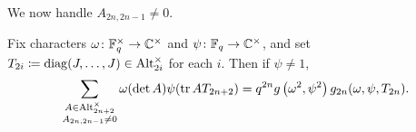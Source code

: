 We now handle $A_{2n,2n-1}\ne0$.
\begin{lemma} \label{lem:gsum-alt-not-0}
    Fix characters $\omega\colon\mathbb F_q^\times\to\mathbb C^\times$ and $\psi\colon\mathbb F_q\to\mathbb C^\times$, and set $T_{2i}\coloneqq\operatorname{diag}(J,\ldots,J)\in\operatorname{Alt}^\times_{2i}$ for each $i$. Then if $\psi\ne1$,
    \[\sum_{\substack{A\in\operatorname{Alt}_{2n+2}^\times\\A_{2n,2n-1}\ne0}}\omega(\det A)\psi(\operatorname{tr} AT_{2n+2})=q^{2n}g\left(\omega^2,\psi^2\right)g_{2n}(\omega,\psi,T_{2n}).
    \]
\end{lemma}
